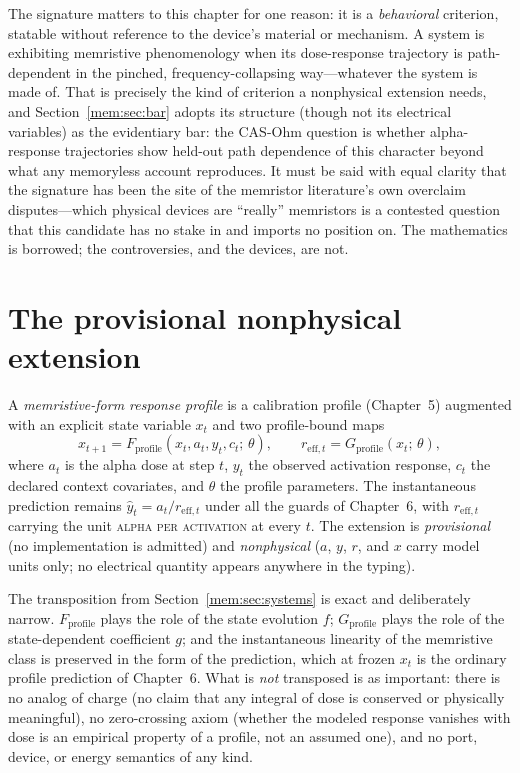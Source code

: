 The signature matters to this chapter for one reason: it is a \emph{behavioral} criterion, statable without reference to the device's material or mechanism. A system is exhibiting memristive phenomenology when its dose-response trajectory is path-dependent in the pinched, frequency-collapsing way---whatever the system is made of. That is precisely the kind of criterion a nonphysical extension needs, and Section~\ref{mem:sec:bar} adopts its structure (though not its electrical variables) as the evidentiary bar: the CAS-Ohm question is whether alpha-response trajectories show held-out path dependence of this character beyond what any memoryless account reproduces. It must be said with equal clarity that the signature has been the site of the memristor literature's own overclaim disputes---which physical devices are ``really'' memristors is a contested question that this candidate has no stake in and imports no position on. The mathematics is borrowed; the controversies, and the devices, are not.

\section{The provisional nonphysical extension}\label{mem:sec:extension}

\begin{definition}\label{mem:def:extension}
A \emph{memristive-form response profile} is a calibration profile (Chapter~5) augmented with an explicit state variable $x_t$ and two profile-bound maps
\[
x_{t+1} = F_{\mathrm{profile}}(x_t, a_t, y_t, c_t;\, \theta), \qquad
r_{\mathrm{eff},t} = G_{\mathrm{profile}}(x_t;\, \theta),
\]
where $a_t$ is the alpha dose at step $t$, $y_t$ the observed activation response, $c_t$ the declared context covariates, and $\theta$ the profile parameters. The instantaneous prediction remains $\hat y_t = a_t / r_{\mathrm{eff},t}$ under all the guards of Chapter~6, with $r_{\mathrm{eff},t}$ carrying the unit \textsc{alpha per activation} at every $t$. The extension is \emph{provisional} (no implementation is admitted) and \emph{nonphysical} ($a$, $y$, $r$, and $x$ carry model units only; no electrical quantity appears anywhere in the typing).
\end{definition}

The transposition from Section~\ref{mem:sec:systems} is exact and deliberately narrow. $F_{\mathrm{profile}}$ plays the role of the state evolution $f$; $G_{\mathrm{profile}}$ plays the role of the state-dependent coefficient $g$; and the instantaneous linearity of the memristive class is preserved in the form of the prediction, which at frozen $x_t$ is the ordinary profile prediction of Chapter~6. What is \emph{not} transposed is as important: there is no analog of charge (no claim that any integral of dose is conserved or physically meaningful), no zero-crossing axiom (whether the modeled response vanishes with dose is an empirical property of a profile, not an assumed one), and no port, device, or energy semantics of any kind.

